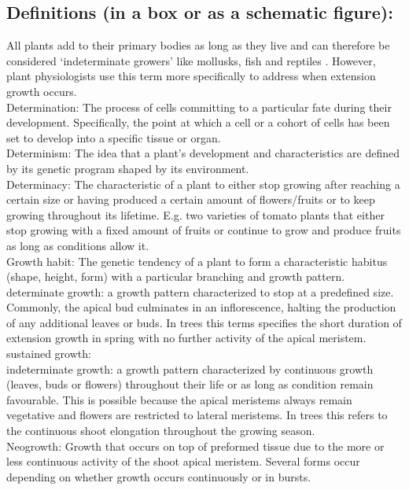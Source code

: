 \documentclass{article}
\begin{document}
	\subsection*{Definitions (in a box or as a schematic figure):}
	All plants add to their primary bodies as long as they live and can therefore be considered ‘indeterminate growers’ like mollusks, fish and reptiles \citep{ejsmondHowTimeGrowth2010}. However, plant physiologists use this term more specifically to address when extension growth occurs.\\
	Determination: The process of cells committing to a particular fate during their development. Specifically, the point at which a cell or a cohort of cells has been set to develop into a specific tissue or organ.\\
	Determinism: The idea that a plant’s development and characteristics are defined by its genetic program shaped by its environment. \\
	Determinacy: The characteristic of a plant to either stop growing after reaching a certain size or having produced a certain amount of flowers/fruits or to keep growing throughout its lifetime. E.g. two varieties of tomato plants that either stop growing with a fixed amount of fruits or continue to grow and produce fruits as long as conditions allow it. \\
	Growth habit: The genetic tendency of a plant to form a characteristic habitus (shape, height, form) with a particular branching and growth pattern. 
	determinate growth: a growth pattern characterized to stop at a predefined size. Commonly, the apical bud culminates in an inflorescence, halting the production of any additional leaves or buds. In trees this terms specifies the short duration of extension growth in spring with no further activity of the apical meristem.\\
	sustained growth:\\
	indeterminate growth: a growth pattern characterized by continuous growth (leaves, buds or flowers) throughout their life or as long as condition remain favourable. This is possible because the apical meristems always remain vegetative and flowers are restricted to lateral meristems. In trees this refers to the continuous shoot elongation throughout the growing season.\\
	Neogrowth: Growth that occurs on top of preformed tissue due to the more or less continuous activity of the shoot apical meristem. Several forms occur depending on whether growth occurs continuously or in bursts.\\
\end{document}
